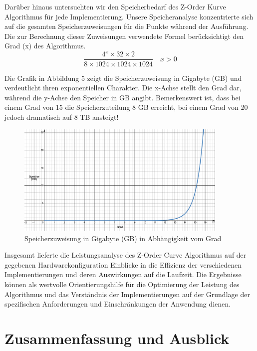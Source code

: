 \documentclass[course=erap]{aspdoc}
\begin{document}
\noindent Darüber hinaus untersuchten wir den Speicherbedarf des Z-Order Kurve Algorithmus für jede Implementierung. Unsere Speicheranalyse konzentrierte sich auf die gesamten Speicherzuweisungen für die Punkte während der Ausführung. Die zur Berechnung dieser Zuweisungen verwendete Formel berücksichtigt den Grad (x) des Algorithmus.
\[
\frac{{4^x \times 32 \times 2}}{{8 \times 1024 \times 1024 \times 1024}}
\quad x > 0
\]
  


\noindent Die Grafik in Abbildung 5 zeigt die Speicherzuweisung in Gigabyte (GB) und verdeutlicht ihren exponentiellen Charakter. Die x-Achse stellt den Grad dar, während die y-Achse den Speicher in GB angibt. Bemerkenswert ist, dass bei einem Grad von 15 die Speicherzuteilung 8 GB erreicht, bei einem Grad von 20 jedoch dramatisch auf 8 TB ansteigt!
\bigskip
\begin{figure}[H]
  \centering
  \includegraphics[width=0.9\textwidth]{speicher_graph.png}
  \caption{Speicherzuweisung in Gigabyte (GB) in Abhängigkeit vom Grad}
  \label{fig:speicher Graph}
\end{figure}

\bigskip
\noindent Insgesamt lieferte die Leistungsanalyse des Z-Order Curve Algorithmus auf der gegebenen Hardwarekonfiguration Einblicke in die Effizienz der verschiedenen Implementierungen und deren Auswirkungen auf die Laufzeit. Die Ergebnisse können als wertvolle Orientierungshilfe für die Optimierung der Leistung des Algorithmus und das Verständnis der Implementierungen auf der Grundlage der spezifischen Anforderungen und Einschränkungen der Anwendung dienen.


\section{Zusammenfassung und Ausblick}
\end{document}
